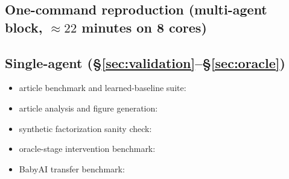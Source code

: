 \documentclass{article}
\begin{document}
\subsection*{One-command reproduction (multi-agent block, $\approx 22$ minutes on 8 cores)}

\subsection*{Single-agent (\S\ref{sec:validation}--\S\ref{sec:oracle})}
\begin{itemize}[leftmargin=16pt]
\item article benchmark and learned-baseline suite: 
\item article analysis and figure generation: 
\item synthetic factorization sanity check: 
\item oracle-stage intervention benchmark: 
\item BabyAI transfer benchmark: 
\end{itemize}
\end{document}
